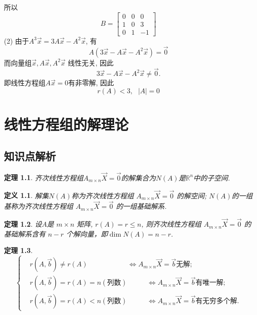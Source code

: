 \documentclass[a4paper]{book}
\newtheorem{Def}{定义}[chapter]
\newtheorem{thm}{定理}[chapter]
\begin{document}
所以\begin{displaymath}B=\begin{bmatrix}0&0&0\\1&0&3\\0&1&-1\end{bmatrix}\end{displaymath}
(2) 由于$A^3\vec{x}=3A\vec{x}-A^2\vec{x}$, 有$$A(3\vec{x}-A\vec{x}-A^2\vec{x})=\vec{0}$$
而向量组$\vec{x},A\vec{x},A^2\vec{x}$ 线性无关, 因此$$3\vec{x}-A\vec{x}-A^2\vec{x}\not=\vec{0}.$$
即线性方程组$A\vec{x}=0$有非零解, 因此$$r(A)<3,\ \ \  |A|=0$$


\chapter{线性方程组的解理论}

\section{知识点解析}

\begin{thm}
齐次线性方程组$A_{m\times n}\vec{X}=\vec{0}$的解集合为$N(A)$是$\mathbb{R}^n$中的子空间.
\end{thm}

\begin{Def}
解集$N(A)$称为齐次线性方程组 $A_{m\times n}\vec{X}=\vec{0}$ 的解空间;
           $N(A)$的一组基称为齐次线性方程组 $A_{m\times n}\vec{X}=\vec{0}$ 的一组基础解系.
\end{Def}

\begin{thm}
设$A$是 $m\times n$ 矩阵, $r(A) = r \leq n$, 则齐次线性方程组 $A_{m\times n}\vec{X}=\vec{0}$ 的基础解系含有 $n - r$ 个解向量，即$\dim N(A)= n - r$.
\end{thm}

\begin{thm}
\begin{displaymath}\left\{\begin{aligned}
&r(A,\vec{b})\not=r(A) \ \ \ \ \ \ \ \ \ \ \ \ \ \  \ \ \ \ \ \ \ \ \ \ \ \   \Leftrightarrow A_{m\times n}\vec{X}=\vec{b}\mbox{无解};\\
&r(A,\vec{b})=r(A)=n(\mbox{列数}) \ \ \ \ \ \ \ \ \ \ \ \ \ \Leftrightarrow A_{m\times n}\vec{X}=\vec{b}\mbox{有唯一解};\\
&r(A,\vec{b})=r(A)<n(\mbox{列数}) \ \ \ \ \ \ \ \ \ \ \ \ \ \Leftrightarrow A_{m\times n}\vec{X}=\vec{b}\mbox{有无穷多个解}.
\end{aligned}\right.\end{displaymath}

\end{thm}
\end{document}
